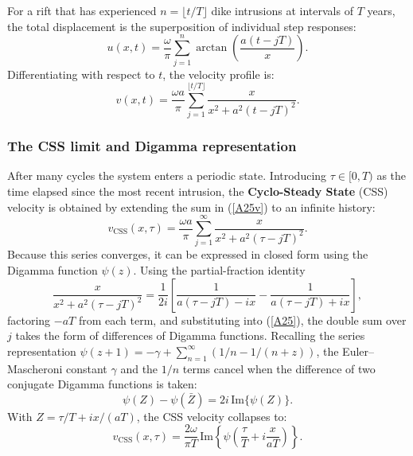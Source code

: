 \documentclass{article}
\newcommand{\IM}{\mathrm{Im}}
\begin{document}
For a rift that has experienced $n = \lfloor t/T\rfloor$ dike intrusions at
intervals of $T$ years, the total displacement is the superposition of
individual step responses:
\begin{equation}
u(x,t) = \frac{\omega}{\pi}\sum_{j=1}^{n}
  \arctan\!\left(\frac{a(t-jT)}{x}\right).
\label{A24}
\end{equation}
Differentiating with respect to $t$, the velocity profile is:
\begin{equation}
v(x,t) = \frac{\omega a}{\pi}\sum_{j=1}^{\lfloor t/T\rfloor}
  \frac{x}{x^2 + a^2(t-jT)^2}.
\label{A25v}
\end{equation}

\subsubsection{The CSS limit and Digamma representation}

After many cycles the system enters a periodic state. Introducing
$\tau\in[0,T)$ as the time elapsed since the most recent intrusion,
the \textbf{Cyclo-Steady State} (CSS) velocity is obtained by extending the
sum in (\ref{A25v}) to an infinite history:
\begin{equation}
v_{\text{CSS}}(x,\tau) = \frac{\omega a}{\pi}
  \sum_{j=1}^{\infty}\frac{x}{x^2 + a^2(\tau-jT)^2}.
\label{A25}
\end{equation}
Because this series converges, it can be expressed in closed form using the
Digamma function $\psi(z)$. Using the partial-fraction identity
\begin{equation*}
\frac{x}{x^2+a^2(\tau-jT)^2}
= \frac{1}{2i}\left[
    \frac{1}{a(\tau-jT)-ix} - \frac{1}{a(\tau-jT)+ix}
  \right],
\end{equation*}
factoring $-aT$ from each term, and substituting into (\ref{A25}), the
double sum over $j$ takes the form of differences of Digamma functions.
Recalling the series representation $\psi(z+1) = -\gamma + \sum_{n=1}^\infty
\!\left(1/n - 1/(n+z)\right)$, the Euler--Mascheroni constant $\gamma$ and
the $1/n$ terms cancel when the difference of two conjugate Digamma functions
is taken:
\begin{equation}
\psi(Z)-\psi(\bar{Z}) = 2i\,\IM\{\psi(Z)\}.
\end{equation}
With $Z = \tau/T + ix/(aT)$, the CSS velocity collapses to:
\begin{equation}
\boxed{v_{\text{CSS}}(x,\tau) =
  \frac{2\omega}{\pi T}\,\IM\!\left\{\psi\!\left(
    \frac{\tau}{T}+i\frac{x}{aT}\right)\right\}.}
\label{A32}
\end{equation}
\end{document}
